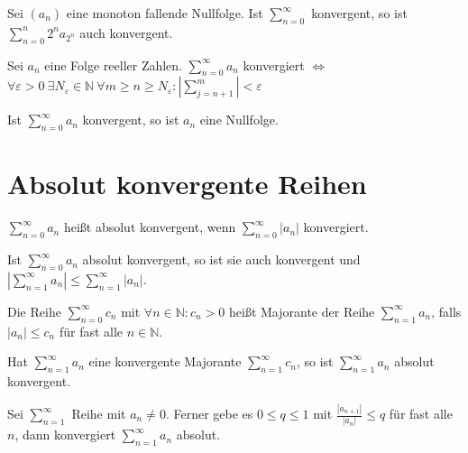 \begin{theorem}
  Sei $(a_n)$ eine monoton fallende Nullfolge. Ist $\sum_{n=0}^{\infty}$ konvergent, so ist $\sum_{n=0}^n 2^n a_{2^n}$ auch konvergent.
\end{theorem}

\begin{theorem}
  Sei $a_n$ eine Folge reeller Zahlen. $\sum_{n=0}^{\infty} a_n$ konvergiert $\iff$ $\forall \varepsilon > 0\: \exists N_{\varepsilon} \in \mathbb{N}\: \forall m \ge n \ge N_{\varepsilon}: \left| \sum_{j=n+1}^m \right| < \varepsilon$
\end{theorem}

\begin{corollary}
  Ist $\sum_{n=0}^{\infty} a_n$ konvergent, so ist $a_n$ eine Nullfolge.
\end{corollary}

\section{Absolut konvergente Reihen}

\begin{definition}
  $\sum_{n=0}^{\infty} a_n$ heißt absolut konvergent, wenn $\sum_{n=0}^{\infty} |a_n|$ konvergiert.
\end{definition}

\begin{theorem}
  Ist $\sum_{n=0}^{\infty} a_n$ absolut konvergent, so ist sie auch konvergent und $\left| \sum_{n=1}^{\infty} a_n \right| \le \sum_{n=1}^{\infty} |a_n|$.
\end{theorem}

\begin{definition}[Majorante]
  Die Reihe $\sum_{n=0}^{\infty} c_n$ mit $\forall n \in \mathbb{N}: c_n > 0$ heißt Majorante der Reihe $\sum_{n=1}^{\infty} a_n$, falls $|a_n| \le c_n$ für fast alle $n \in \mathbb{N}$.
\end{definition}

\begin{theorem}[Majorantenkriterium]
  Hat $\sum_{n=1}^{\infty} a_n$ eine konvergente Majorante $\sum_{n=1}^{\infty} c_n$, so ist $\sum_{n=1}^{\infty} a_n$ absolut konvergent.
\end{theorem}

\begin{theorem}[Quotientenkriterium]
  Sei $\sum_{n=1}^{\infty}$ Reihe mit $a_n \ne 0$. Ferner gebe es $0 \le q \le 1$ mit $\frac{|a_{n+1}|}{|a_n|} \le q$ für fast alle $n$, dann konvergiert $\sum_{n=1}^{\infty} a_n$ absolut.
\end{theorem}

